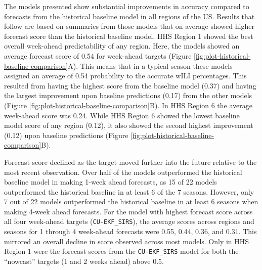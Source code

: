 \documentclass[9pt,twocolumn,twoside]{pnas-new}\usepackage[]{graphicx}\usepackage[]{color}
\begin{document}
The models presented show substantial improvements in accuracy compared to forecasts from the historical baseline model in all regions of the US.
Results that follow are based on summaries from those models that on average showed higher forecast score than the historical baseline model.
HHS Region 1 showed the best overall week-ahead predictability of any region. Here, the models showed an average forecast score of 
0.54 
for week-ahead targets (Figure \ref{fig:plot-historical-baseline-comparison}A). 
This means that in a typical season these models assigned an average of 
0.54 
probability to the accurate wILI percentages.
This resulted from having the highest score from the baseline model 
(0.37) 
and having the largest improvement upon baseline predictions 
(0.17)
from the other models (Figure \ref{fig:plot-historical-baseline-comparison}B).  
In HHS Region 6 the average week-ahead score was 
0.24. 
While HHS Region 6 showed the lowest baseline model score of any region
(0.12), 
it also showed the second highest improvement
(0.12)
upon baseline predictions (Figure \ref{fig:plot-historical-baseline-comparison}B).





Forecast score declined as the target moved further into the future relative to the most recent observation.
Over half of the models outperformed the historical baseline model in making 1-week ahead forecasts, as 15 of 22 models outperformed the historical baseline in at least 6 of the 7 seasons.
However, only 7 out of 22 models outperformed the historical baseline in at least 6 seasons when making 4-week ahead forecasts.
For the model with highest forecast score across all four week-ahead targets ({\tt CU-EKF\_SIRS}), the average scores across regions and seasons for 1 through 4 week-ahead forecasts were 
0.55, 
0.44, 
0.36, and 
0.31.
This mirrored an overall decline in score observed across most models.
Only in HHS Region 1 were the forecast scores from the {\tt CU-EKF\_SIRS} model for both the ``nowcast'' targets (1 and 2 weeks ahead) above 0.5.
\end{document}
